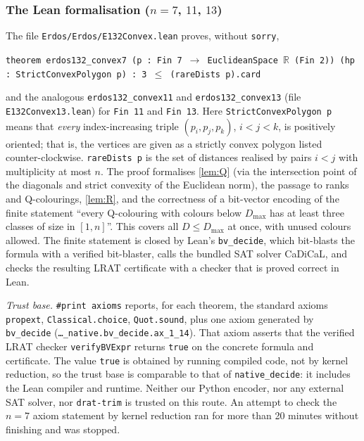 \documentclass[11pt]{amsart}
\theoremstyle{definition}
\theoremstyle{remark}
\newcommand{\R}{\mathbb{R}}
\begin{document}
\subsubsection*{The Lean formalisation ($n=7$, $11$, $13$)}
The file \texttt{Erdos/Erdos/E132Convex.lean} proves, without \texttt{sorry},
\begin{center}
\texttt{theorem erdos132\_convex7 (p : Fin 7 $\to$ EuclideanSpace $\R$ (Fin 2)) (hp : StrictConvexPolygon p) : 3 $\le$ (rareDists p).card}
\end{center}
and the analogous \texttt{erdos132\_convex11} and \texttt{erdos132\_convex13} (file \texttt{E132Convex13.lean}) for \texttt{Fin 11} and \texttt{Fin 13}. Here \texttt{StrictConvexPolygon p} means that \emph{every} index-increasing triple $(p_i,p_j,p_k)$, $i<j<k$, is positively oriented; that is, the vertices are given as a strictly convex polygon listed counter-clockwise. \texttt{rareDists p} is the set of distances realised by pairs $i<j$ with multiplicity at most $n$. The proof formalises \cref{lem:Q} (via the intersection point of the diagonals and strict convexity of the Euclidean norm), the passage to ranks and Q-colourings, \cref{lem:R}, and the correctness of a bit-vector encoding of the finite statement ``every Q-colouring with colours below $D_{\max}$ has at least three classes of size in $[1,n]$''. This covers all $D\le D_{\max}$ at once, with unused colours allowed. The finite statement is closed by Lean's \texttt{bv\_decide}, which bit-blasts the formula with a verified bit-blaster, calls the bundled SAT solver CaDiCaL, and checks the resulting LRAT certificate with a checker that is proved correct in Lean.

\emph{Trust base.} \texttt{\#print\allowbreak{} axioms} reports, for each theorem, the standard axioms \texttt{propext}, \texttt{Classical.choice}, \texttt{Quot.sound}, plus one axiom generated by \texttt{bv\_decide} (\texttt{\dots\_native.\allowbreak bv\_decide.\allowbreak ax\_1\_14}). That axiom asserts that the verified LRAT checker \texttt{verifyBVExpr} returns \texttt{true} on the concrete formula and certificate. The value \texttt{true} is obtained by running compiled code, not by kernel reduction, so the trust base is comparable to that of \texttt{native\_decide}: it includes the Lean compiler and runtime. Neither our Python encoder, nor any external SAT solver, nor \texttt{drat-trim} is trusted on this route. An attempt to check the $n=7$ axiom statement by kernel reduction ran for more than 20 minutes without finishing and was stopped.
\end{document}

